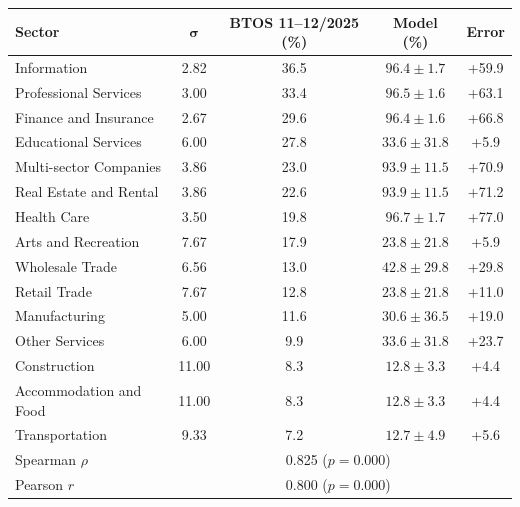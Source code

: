 \begin{tabular}{lcccc}
\toprule
\textbf{Sector} & $\boldsymbol{\sigma}$ & \textbf{BTOS 11--12/2025 (\%)} & \textbf{Model (\%)} & \textbf{Error} \\
\midrule
Information & 2.82 & 36.5 & $96.4 \pm 1.7$ & +59.9 \\
Professional Services & 3.00 & 33.4 & $96.5 \pm 1.6$ & +63.1 \\
Finance and Insurance & 2.67 & 29.6 & $96.4 \pm 1.6$ & +66.8 \\
Educational Services & 6.00 & 27.8 & $33.6 \pm 31.8$ & +5.9 \\
Multi-sector Companies & 3.86 & 23.0 & $93.9 \pm 11.5$ & +70.9 \\
Real Estate and Rental & 3.86 & 22.6 & $93.9 \pm 11.5$ & +71.2 \\
Health Care & 3.50 & 19.8 & $96.7 \pm 1.7$ & +77.0 \\
Arts and Recreation & 7.67 & 17.9 & $23.8 \pm 21.8$ & +5.9 \\
Wholesale Trade & 6.56 & 13.0 & $42.8 \pm 29.8$ & +29.8 \\
Retail Trade & 7.67 & 12.8 & $23.8 \pm 21.8$ & +11.0 \\
Manufacturing & 5.00 & 11.6 & $30.6 \pm 36.5$ & +19.0 \\
Other Services & 6.00 & 9.9 & $33.6 \pm 31.8$ & +23.7 \\
Construction & 11.00 & 8.3 & $12.8 \pm 3.3$ & +4.4 \\
Accommodation and Food & 11.00 & 8.3 & $12.8 \pm 3.3$ & +4.4 \\
Transportation & 9.33 & 7.2 & $12.7 \pm 4.9$ & +5.6 \\
\midrule
\multicolumn{2}{l}{Spearman $\rho$} & \multicolumn{2}{c}{0.825 ($p = 0.000$)} & \\
\multicolumn{2}{l}{Pearson $r$} & \multicolumn{2}{c}{0.800 ($p = 0.000$)} & \\
\bottomrule
\end{tabular}
